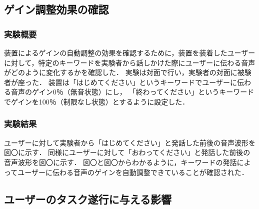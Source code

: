 \documentclass[a4paper]{jarticle}
\begin{document}
\subsection{ゲイン調整効果の確認}
\subsubsection{実験概要}
装置によるゲインの自動調整の効果を確認するために，装置を装着したユーザーに対して，特定のキーワードを実験者から話しかけた際にユーザーに伝わる音声がどのように変化するかを確認した．
実験は対面で行い，実験者の対面に被験者が座った．
装置は「はじめてください」というキーワードでユーザーに伝わる音声のゲイン0％（無音状態）にし，
「終わってください」というキーワードでゲインを100％（制限なし状態）とするように設定した．

\subsubsection{実験結果}
ユーザーに対して実験者から「はじめてください」と発話した前後の音声波形を図〇に示す．
同様にユーザーに対して「おわってください」と発話した前後の音声波形を図〇に示す．
図〇と図〇からわかるように，キーワードの発話によってユーザーに伝わる音声のゲインを自動調整できていることが確認された．
\subsection{ユーザーのタスク遂行に与える影響}
\end{document}
